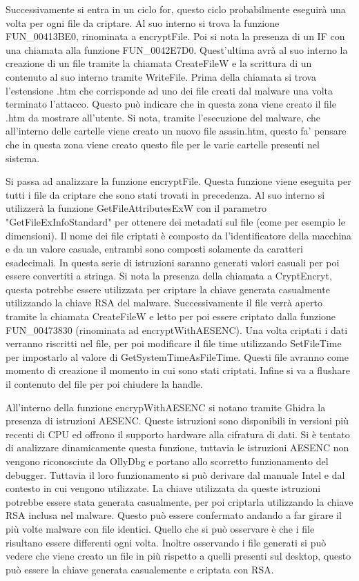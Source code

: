 \documentclass[a4paper,12pt]{article}
\begin{document}
Successivamente si entra in un ciclo for, questo ciclo probabilmente eseguirà una volta per ogni file da criptare. Al suo interno si trova la funzione FUN\_00413BE0, rinominata a encryptFile. Poi si nota la presenza di un IF con una chiamata alla funzione FUN\_0042E7D0. Quest'ultima avrà al suo interno la creazione di un file tramite la chiamata CreateFileW e la scrittura di un contenuto al suo interno tramite WriteFile. Prima della chiamata si trova l'estensione .htm che corrisponde ad uno dei file creati dal malware una volta terminato l'attacco. Questo può indicare che in questa zona viene creato il file .htm da mostrare all'utente. Si nota, tramite l'esecuzione del malware, che all'interno delle cartelle viene creato un nuovo file asasin.htm, questo fa' pensare che in questa zona viene creato questo file per le varie cartelle presenti nel sistema.

Si passa ad analizzare la funzione encryptFile. Questa funzione viene eseguita per tutti i file da criptare che sono stati trovati in precedenza. Al suo interno si utilizzerà la funzione GetFileAttributesExW con il parametro "GetFileExInfoStandard" per ottenere dei metadati sul file (come per esempio le dimensioni).  Il nome dei file criptati è composto da l'identificatore della macchina e da un valore casuale, entrambi sono composti solamente da caratteri esadecimali. In questa serie di istruzioni saranno generati valori casuali per poi essere convertiti a stringa.
Si nota la presenza della chiamata a CryptEncryt, questa potrebbe essere utilizzata per criptare la chiave generata casualmente utilizzando la chiave RSA del malware.
Successivamente il file verrà aperto tramite la chiamata CreateFileW e letto per poi essere criptato dalla funzione FUN\_00473830 (rinominata ad encryptWithAESENC). Una volta criptati i dati verranno riscritti nel file, per poi modificare il file time utilizzando SetFileTime per impostarlo al valore di GetSystemTimeAsFileTime. Questi file avranno come momento di creazione il momento in cui sono stati criptati. Infine si va a flushare il contenuto del file per poi chiudere la handle. 

All'interno della funzione encrypWithAESENC si notano tramite Ghidra la presenza di istruzioni AESENC. Queste istruzioni sono disponibili in versioni più recenti di CPU ed offrono il supporto hardware alla cifratura di dati. Si è tentato di analizzare dinamicamente questa funzione, tuttavia le istruzioni AESENC non vengono riconosciute da OllyDbg e portano allo scorretto funzionamento del debugger. Tuttavia il loro funzionamento si può derivare dal manuale Intel e dal contesto in cui vengono utilizzate. La chiave utilizzata da queste istruzioni potrebbe essere stata generata casualmente, per poi criptarla utilizzando la chiave RSA inclusa nel malware. Questo può essere confermato andando a far girare il  più volte malware con file identici. Quello che si può osservare è che i file risultano essere differenti ogni volta. Inoltre osservando i file generati si può vedere che viene creato un file in più rispetto a quelli presenti sul desktop, questo può essere la chiave generata casualemente e criptata con RSA.
 
\end{document}
